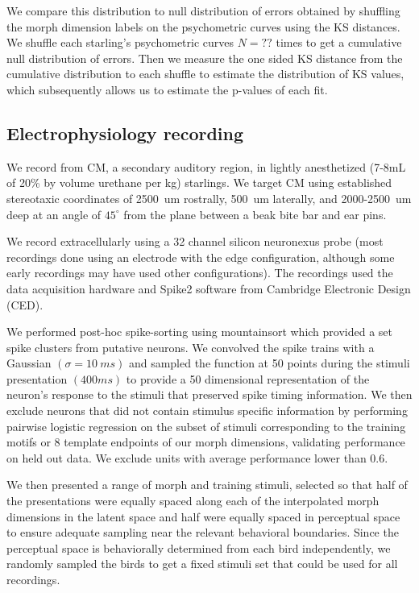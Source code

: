 We compare this distribution to null distribution of errors obtained by shuffling the morph dimension labels on the psychometric curves using the \ac{KS} distances. We shuffle each starling's psychometric curves $N=??$ times to get a cumulative null distribution of errors. Then we measure the one sided KS distance from the cumulative distribution to each shuffle to estimate the distribution of KS values, which subsequently allows us to estimate the p-values of each fit.

\subsection*{Electrophysiology recording}

We record from \ac{CM}, a secondary auditory region, in lightly anesthetized (7-8mL of 20\% by volume urethane per kg) starlings. We target \ac{CM} using established stereotaxic coordinates of \SI{2500}{um} rostrally, \SI{500}{um} laterally, and 2000-\SI{2500}{um} deep at an angle of $45^\circ$ from the plane between a beak bite bar and ear pins. 

We record extracellularly using a 32 channel silicon neuronexus probe (most recordings done using an electrode with the edge configuration, although some early recordings may have used other configurations). The recordings used the data acquisition hardware and Spike2 software from Cambridge Electronic Design (CED).

We performed post-hoc spike-sorting using mountainsort\cite{mountainsort} which provided a set spike clusters from putative neurons. We convolved the spike trains with a Gaussian $(\sigma=\SI{10}{ms})$ and sampled the function at 50 points during the stimuli presentation $(400 ms)$ to provide a 50 dimensional representation of the neuron's response to the stimuli that preserved spike timing information. We then exclude neurons that did not contain stimulus specific information by performing pairwise logistic regression on the subset of stimuli corresponding to the training motifs or 8 template endpoints of our morph dimensions, validating performance on held out data. We exclude units with average performance lower than 0.6.

We then presented a range of morph and training stimuli, selected so that half of the presentations were equally spaced along each of the interpolated morph dimensions in the latent space and half were equally spaced in perceptual space to ensure adequate sampling near the relevant behavioral boundaries. Since the perceptual space is behaviorally determined from each bird independently, we randomly sampled the birds to get a fixed stimuli set that could be used for all recordings.

